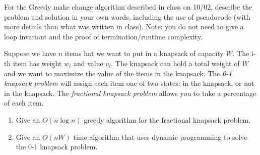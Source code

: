 \documentclass{article}
\begin{document}
\nextprob
For the Greedy make change algorithm described in class on 10/02, describe the
problem and solution in your own words, including the use of pseudocode (with
more details than what was written in class).  Note: you do not need to give a
loop invariant and the proof of termination/runtime complexity.

\nextprob
Suppose we have $n$ items hat we want to put in a knapsack of capacity $W$.  The i-th item has
weight $w_i$ and value $v_i$.  The knapsack can hold a total weight of $W$ and
we want to maximize the value of the items in the knapsack.
The \emph{0-1 knapsack problem} will assign each item one of two states: in the
knapsack, or not in the knapsack.  The \emph{fractional knapsack problem} allows
you to take a percentage of each item.
\begin{enumerate}
    \item Give an $O(n\log n)$ greedy algorithm for the fractional knapsack problem.
    \item Give an $O(nW)$ time algorithm that uses dynamic programming to solve
        the 0-1 knapsack problem.
\end{enumerate}
\end{document}
